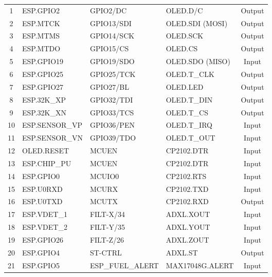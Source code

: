 \documentclass[10pt]{datasheet}
\begin{document}
\begin{longtable}{c | l | l | >{\raggedright\arraybackslash}p{4.5cm} | c}
    1  & ESP.GPIO2       & GPIO2/DC         & OLED.D/C                 & Output \\
    2  & ESP.MTCK        & GPIO13/SDI       & OLED.SDI (MOSI)          & Output \\
    3  & ESP.MTMS        & GPIO14/SCK       & OLED.SCK                 & Output \\
    4  & ESP.MTDO        & GPIO15/CS        & OLED.CS                  & Output \\
    5  & ESP.GPIO19      & GPIO19/SDO       & OLED.SDO (MISO)          & Input  \\
    6  & ESP.GPIO25      & GPIO25/TCK       & OLED.T\_CLK              & Output \\
    7  & ESP.GPIO27      & GPIO27/BL        & OLED.LED                 & Output \\
    8  & ESP.32K\_XP     & GPIO32/TDI       & OLED.T\_DIN              & Output \\
    9  & ESP.32K\_XN     & GPIO33/TCS       & OLED.T\_CS               & Output \\
    10 & ESP.SENSOR\_VP  & GPIO36/PEN       & OLED.T\_IRQ              & Input  \\
    11 & ESP.SENSOR\_VN  & GPIO39/TDO       & OLED.T\_OUT              & Input  \\
    12 & OLED.RESET      & MCUEN            & CP2102.DTR               & Input  \\
    \hline
    13 & ESP.CHIP\_PU    & MCUEN            & CP2102.DTR               & Input  \\
    14 & ESP.GPIO0       & MCUIO0           & CP2102.RTS               & Input  \\
    15 & ESP.U0RXD       & MCURX            & CP2102.TXD               & Input  \\
    16 & ESP.U0TXD       & MCUTX            & CP2102.RXD               & Output \\
    \hline
    17 & ESP.VDET\_1     & FILT-X/34        & ADXL.XOUT                & Input  \\
    18 & ESP.VDET\_2     & FILT-Y/35        & ADXL.YOUT                & Input  \\
    19 & ESP.GPIO26      & FILT-Z/26        & ADXL.ZOUT                & Input  \\
    20 & ESP.GPIO4       & ST-CTRL          & ADXL.ST                  & Output \\
    \hline
    21 & ESP.GPIO5       & ESP\_FUEL\_ALERT & MAX17048G.ALERT          & Input  \\

\end{longtable}
\end{document}
